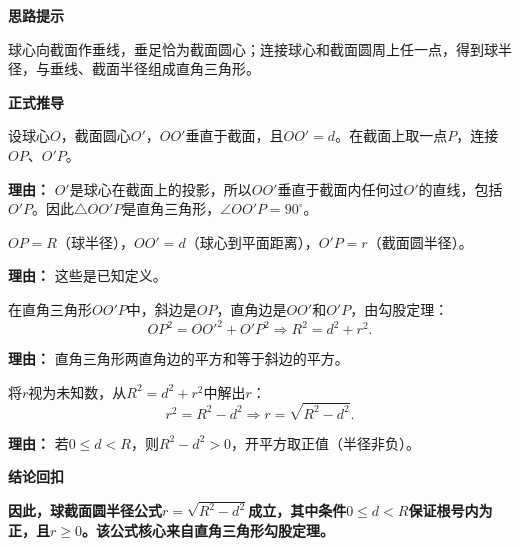 \begin{proofbox}
	\textbf{\textcolor{CProof}{思路提示}}

	球心向截面作垂线，垂足恰为截面圆心；连接球心和截面圆周上任一点，得到球半径，与垂线、截面半径组成直角三角形。

	\medskip
	\textbf{\textcolor{CProof}{正式推导}}
	\begin{description}[style=nextline, leftmargin=2.8em, labelsep=0.5em, itemsep=0.55em]
		\item[\textbf{步骤一（作辅助线）：}] 设球心$O$，截面圆心$O'$，$OO'$垂直于截面，且$OO'=d$。在截面上取一点$P$，连接$OP$、$O'P$。
			\par\textbf{理由：} $O'$是球心在截面上的投影，所以$OO'$垂直于截面内任何过$O'$的直线，包括$O'P$。因此$\triangle OO'P$是直角三角形，$\angle OO'P=90^\circ$。
		\item[\textbf{步骤二（标识已知量）：}] $OP=R$（球半径），$OO'=d$（球心到平面距离），$O'P=r$（截面圆半径）。
			\par\textbf{理由：} 这些是已知定义。
		\item[\textbf{步骤三（应用勾股定理）：}] 在直角三角形$OO'P$中，斜边是$OP$，直角边是$OO'$和$O'P$，由勾股定理：
			\[
				OP^{2} = OO'^{2} + O'P^{2} \Longrightarrow R^{2} = d^{2} + r^{2}.
			\]
			\par\textbf{理由：} 直角三角形两直角边的平方和等于斜边的平方。
		\item[\textbf{步骤四（解出截面半径）：}] 将$r$视为未知数，从$R^{2}=d^{2}+r^{2}$中解出$r$：
			\[
				r^{2} = R^{2} - d^{2} \Longrightarrow r = \sqrt{R^{2} - d^{2}}.
			\]
			\par\textbf{理由：} 若$0\le d<R$，则$R^{2}-d^{2}>0$，开平方取正值（半径非负）。
	\end{description}

	\medskip
	\textbf{\textcolor{CProof}{结论回扣}}

	\textbf{因此，球截面圆半径公式$r=\sqrt{R^{2}-d^{2}}$成立，其中条件$0\le d<R$保证根号内为正，且$r\ge0$。该公式核心来自直角三角形勾股定理。}
\end{proofbox}
